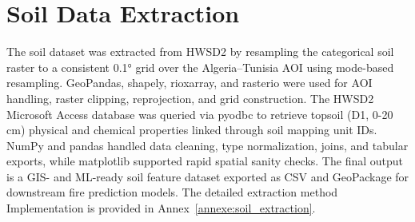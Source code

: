 \section{Soil Data Extraction}
The soil dataset was extracted from HWSD2 by resampling the categorical soil raster to a consistent 0.1° grid over the Algeria–Tunisia AOI using mode-based resampling. GeoPandas, shapely, rioxarray, and rasterio were used for AOI handling, raster clipping, reprojection, and grid construction. The HWSD2 Microsoft Access database was queried via pyodbc to retrieve topsoil (D1, 0-20 cm) physical and chemical properties linked through soil mapping unit IDs. NumPy and pandas handled data cleaning, type normalization, joins, and tabular exports, while matplotlib supported rapid spatial sanity checks. The final output is a GIS- and ML-ready soil feature dataset exported as CSV and GeoPackage for downstream fire prediction models. The detailed extraction method Implementation is provided in Annex~\ref{annexe:soil_extraction}.